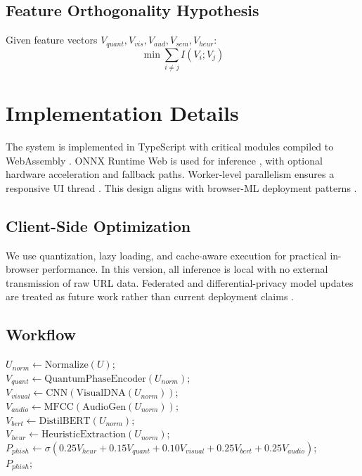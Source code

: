 \documentclass[conference]{IEEEtran}
\begin{document}
\subsection{Feature Orthogonality Hypothesis}
Given feature vectors $V_{quant}, V_{vis}, V_{aud}, V_{sem}, V_{heur}$:
\begin{equation}
\min \sum_{i \neq j} I(V_i;V_j)
\end{equation}

\section{Implementation Details}
The system is implemented in TypeScript with critical modules compiled to WebAssembly \cite{b39}. ONNX Runtime Web is used for inference \cite{b40}, with optional hardware acceleration and fallback paths. Worker-level parallelism ensures a responsive UI thread \cite{b41}. This design aligns with browser-ML deployment patterns \cite{b16}.

\subsection{Client-Side Optimization}
We use quantization, lazy loading, and cache-aware execution for practical in-browser performance. In this version, all inference is local with no external transmission of raw URL data. Federated and differential-privacy model updates are treated as future work rather than current deployment claims \cite{b2,b55}.

\subsection{Workflow}
\begin{algorithm}[h]
\SetAlgoLined
{}
$U_{norm} \leftarrow \text{Normalize}(U)$; \\
$V_{quant} \leftarrow \text{QuantumPhaseEncoder}(U_{norm})$; \\
$V_{visual} \leftarrow \text{CNN}(\text{VisualDNA}(U_{norm}))$; \\
$V_{audio} \leftarrow \text{MFCC}(\text{AudioGen}(U_{norm}))$; \\
$V_{bert} \leftarrow \text{DistilBERT}(U_{norm})$; \\
$V_{heur} \leftarrow \text{HeuristicExtraction}(U_{norm})$; \\
$P_{phish} \leftarrow \sigma(0.25V_{heur}+0.15V_{quant}+0.10V_{visual}+0.25V_{bert}+0.25V_{audio})$; \\
\Return $P_{phish}$;
\caption{Multimodality inference pipeline}
\end{algorithm}
\end{document}
